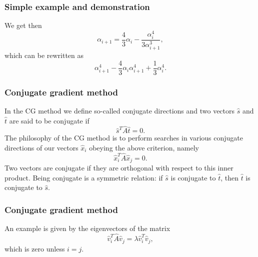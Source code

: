 \documentclass{beamer}
\begin{document}
\begin{frame}
\frametitle{Simple example and demonstration}

\begin{block}{}
We get then
\begin{equation*}
\alpha_{i+1}=\frac{4}{3}\alpha_i-\frac{\alpha_i^4}{3\alpha_{i+1}^3},
\end{equation*}
which can be rewritten as
\begin{equation*}
\alpha_{i+1}^4-\frac{4}{3}\alpha_i\alpha_{i+1}^4+\frac{1}{3}\alpha_i^4.
\end{equation*}
\end{block}
\end{frame}

\begin{frame}
\frametitle{Conjugate gradient method}

\begin{block}{}
In the CG method we define so-called conjugate directions and two vectors 
$\hat{s}$ and $\hat{t}$
are said to be
conjugate if
\begin{equation*}
\hat{s}^T\hat{A}\hat{t}= 0.
\end{equation*}
The philosophy of the CG method is to perform searches in various conjugate directions
of our vectors $\hat{x}_i$ obeying the above criterion, namely
\begin{equation*}
\hat{x}_i^T\hat{A}\hat{x}_j= 0.
\end{equation*}
Two vectors are conjugate if they are orthogonal with respect to 
this inner product. Being conjugate is a symmetric relation: if $\hat{s}$ is conjugate to $\hat{t}$, then $\hat{t}$ is conjugate to $\hat{s}$.
\end{block}
\end{frame}

\begin{frame}
\frametitle{Conjugate gradient method}

\begin{block}{}
An example is given by the eigenvectors of the matrix
\begin{equation*}
\hat{v}_i^T\hat{A}\hat{v}_j= \lambda\hat{v}_i^T\hat{v}_j,
\end{equation*}
which is zero unless $i=j$. 
\end{block}
\end{frame}
\end{document}
